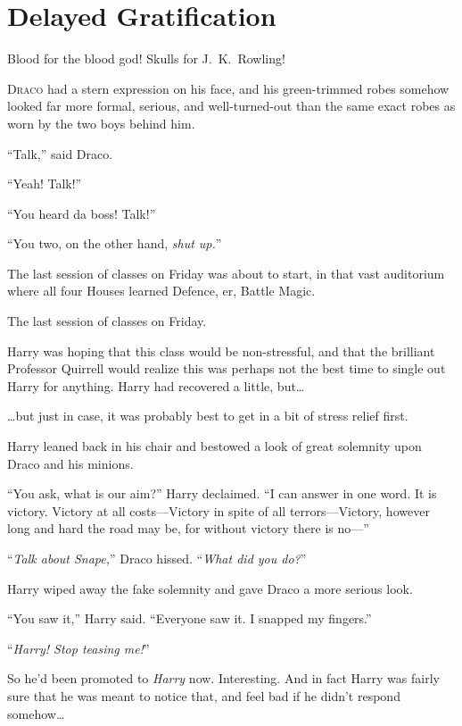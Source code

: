\chapter{Delayed Gratification}

\begin{chapterOpeningAuthorNote}
Blood for the blood god! Skulls for J.~K.~Rowling!
\end{chapterOpeningAuthorNote}

\lettrine{D}{raco} had a stern expression on his face, and his green-trimmed robes somehow looked far more formal, serious, and well-turned-out than the same exact robes as worn by the two boys behind him.

“Talk,” said Draco.

“Yeah! Talk!”

“You heard da boss! Talk!”

“You two, on the other hand, \emph{shut up.}”

The last session of classes on Friday was about to start, in that vast auditorium where all four Houses learned Defence, er, Battle Magic.

The last session of classes on Friday.

Harry was hoping that this class would be non-stressful, and that the brilliant Professor Quirrell would realize this was perhaps not the best time to single out Harry for anything. Harry had recovered a little, but…

…but just in case, it was probably best to get in a bit of stress relief first.

Harry leaned back in his chair and bestowed a look of great solemnity upon Draco and his minions.

“You ask, what is our aim?” Harry declaimed. “I can answer in one word. It is victory. Victory at all costs—Victory in spite of all terrors—Victory, however long and hard the road may be, for without victory there is no—”

“\emph{Talk about Snape,}” Draco hissed. “\emph{What did you do?}”

Harry wiped away the fake solemnity and gave Draco a more serious look.

“You saw it,” Harry said. “Everyone saw it. I snapped my fingers.”

“\emph{Harry! Stop teasing me!}”

So he’d been promoted to \emph{Harry} now. Interesting. And in fact Harry was fairly sure that he was meant to notice that, and feel bad if he didn’t respond somehow…

